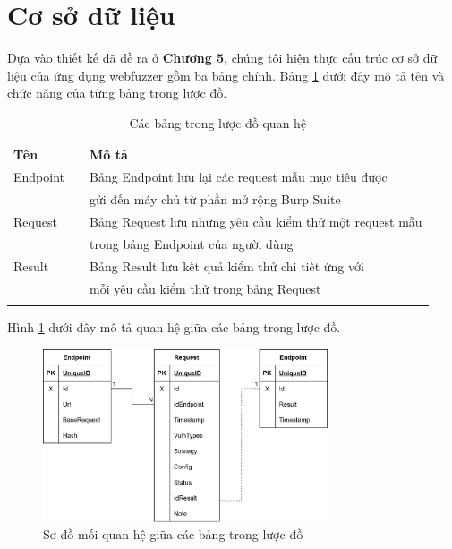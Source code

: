 \section{Cơ sở dữ liệu}
Dựa vào thiết kế đã đề ra ở \textbf{Chương 5}, chúng tôi hiện thực cấu trúc cơ sở dữ liệu của ứng dụng webfuzzer gồm ba bảng chính. Bảng \ref{tab:db-tables} dưới đây mô tả tên và chức năng của từng bảng trong lược đồ.
\begin{table}[ht]
    \centering
    \caption{Các bảng trong lược đồ quan hệ}
    \label{tab:db-tables}
    \begin{tabular}[ht]{lll}
        \toprule[1pt]\midrule[0.3pt]
            \textbf{Tên}& &\textbf{Mô tả}\\ 
        \midrule
            Endpoint& &Bảng Endpoint lưu lại các request mẫu mục tiêu được\\
            {}& &gửi đến máy chủ từ phần mở rộng Burp Suite\\
            \addlinespace
            Request& &Bảng Request lưu những yêu cầu kiểm thử một request mẫu \\
            {}& &trong bảng Endpoint của người dùng\\
            \addlinespace
            Result& &Bảng Result lưu kết quả kiểm thử chi tiết ứng với\\
            {}& &mỗi yêu cầu kiểm thử trong bảng Request\\
            \addlinespace
        \midrule[0.3pt]\bottomrule[1pt]
    \end{tabular}
\end{table}
\FloatBarrier
Hình \ref{fig:db-schema} dưới đây mô tả quan hệ giữa các bảng trong lược đồ.
\begin{figure}[H]
  \centering
    \includegraphics[width=0.75\textwidth,keepaspectratio=true]{images/database-design.png}
  \caption{Sơ đồ mối quan hệ giữa các bảng trong lược đồ}
  \label{fig:db-schema}
\end{figure}
